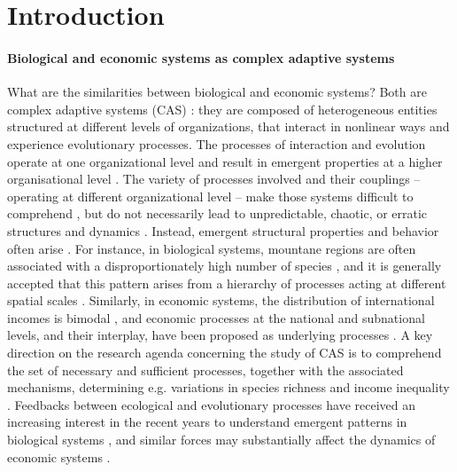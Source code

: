 %
\chapter{Introduction}



\label{sec:intro}


\subsubsection*{Biological and economic systems as complex adaptive systems}
What are the similarities between biological and economic systems? Both are complex adaptive systems (CAS) \cite{Levin2002}: they are composed of heterogeneous entities structured at different levels of organizations, that interact in nonlinear ways and experience evolutionary processes. The processes of interaction and evolution operate at one organizational level and result in emergent properties at a higher organisational level \cite{Levin1998}. The variety of processes involved and their couplings -- operating at different organizational level -- make those systems difficult to comprehend \cite{Strogatz2001a}, but do not necessarily lead to unpredictable, chaotic, or erratic structures and dynamics \cite{Olff2009}. Instead, emergent structural properties and behavior often arise \cite{mitchell2009complexity}.
% 
For instance, in biological systems, mountane regions are often associated with a disproportionately high number of species \cite{Rahbek2019}, and it is generally accepted that this pattern arises from a hierarchy of processes acting at different spatial scales \cite{Rangel2018,Rahbek2019a}.
% 
Similarly, in economic systems, the distribution of international incomes is bimodal \cite{acemoglu2001colonial}, and economic processes at the national and subnational levels, and their interplay, have been proposed as underlying processes \cite{Hidalgo2021,C.A.HidalgoB.Klinger}. 
% 
A key direction on the research agenda concerning the study of CAS is to comprehend the set of necessary and sufficient processes, together with the associated mechanisms, determining e.g. variations in species richness and income inequality \cite{Vellend2010a}.
% 
Feedbacks between ecological and evolutionary processes have received an increasing interest in the recent years to understand emergent patterns in biological systems \cite{Pelletier2009}, and similar forces may substantially affect the dynamics of economic systems \cite{Hodgson2019}.

